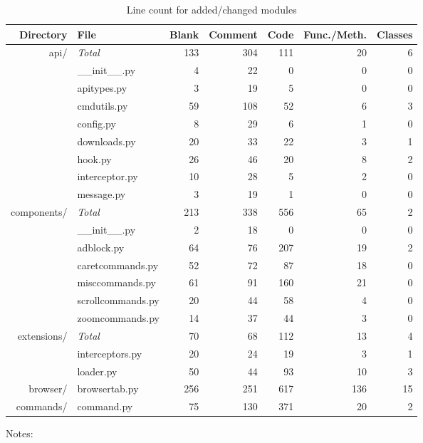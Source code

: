 \begingroup
\renewcommand{\arraystretch}{1}
\begin{table}[H]
  \centering
  \begin{tabulary}{\linewidth}{rlrrrrr}
    \toprule
    Directory & File & Blank & Comment & Code & Func./Meth. & Classes \\
    \midrule
    api/ & \emph{Total} & 133 & 304 & 111 & 20 & 6 \\
    & \_\_init\_\_.py & 4 & 22 & 0 & 0 & 0 \\
    & apitypes.py & 3 & 19 & 5 & 0 & 0 \\
    & cmdutils.py & 59 & 108 & 52 & 6 & 3 \\
    & config.py & 8 & 29 & 6 & 1 & 0 \\
    & downloads.py & 20 & 33 & 22 & 3 & 1 \\
    & hook.py & 26 & 46 & 20 & 8 & 2 \\
    & interceptor.py & 10 & 28 & 5 & 2 & 0 \\
    & message.py & 3 & 19 & 1 & 0 & 0\vspace{1em} \\
    components/ & \emph{Total} & 213 & 338 & 556 & 65 & 2 \\
    & \_\_init\_\_.py & 2 & 18 & 0 & 0 & 0 \\
    & adblock.py & 64 & 76 & 207 & 19 & 2 \\
    & caretcommands.py & 52 & 72 & 87 & 18 & 0 \\
    & misccommands.py & 61 & 91 & 160 & 21 & 0 \\
    & scrollcommands.py & 20 & 44 & 58 & 4 & 0 \\
    & zoomcommands.py & 14 & 37 & 44 & 3 & 0\vspace{1em} \\
    extensions/ & \emph{Total} & 70 & 68 & 112 & 13 & 4 \\
    & interceptors.py & 20 & 24 & 19 & 3 & 1 \\
    & loader.py & 50 & 44 & 93 & 10 & 3\vspace{1em} \\
    browser/ & browsertab.py & 256 & 251 & 617 & 136 & 15 \\
    commands/ & command.py & 75 & 130 & 371 & 20 & 2 \\
    \bottomrule
  \end{tabulary}
  \caption{Line count for added/changed modules}
  \label{tab:coverage}
\end{table}
\endgroup

Notes:

